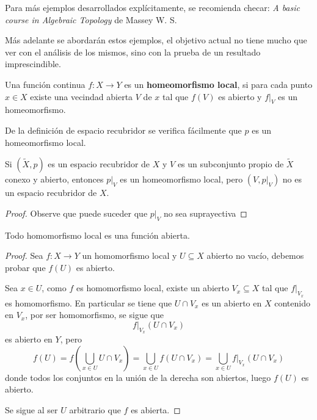 \documentclass{article}
\theoremstyle{largebreak}
\newcommand\cf[3]{\ensuremath{#1:#2\rightarrow#3}}
\begin{document}
    \begin{obs}
        Para más ejemplos desarrollados explícitamente, se recomienda checar: \textit{A basic course in Algebraic Topology} de Massey W. S.

        Más adelante se abordarán estos ejemplos, el objetivo actual no tiene mucho que ver con el análisis de los mismos, sino con la prueba de un resultado imprescindible.
    \end{obs}

    \begin{mydef}
        Una función continua $\cf{f}{X}{Y}$ es un \textbf{homeomorfismo local}, si para cada punto $x\in X$ existe una vecindad abierta $V$ de $x$ tal que $f(V)$ es abierto y $f\big|_{V}$ es un homeomorfismo.
    \end{mydef}

    \begin{obs}
        De la definición de espacio recubridor se verifica fácilmente que $p$ es un homeomorfismo local.
    \end{obs}

    \begin{exa}
        Si $(\widetilde{X},p)$ es un espacio recubridor de $X$ y $V$ es un subconjunto propio de $\widetilde{X}$ conexo y abierto, entonces $p\big|_{V}$ es un homeomorfismo local, pero $(V,p\big|_{V})$ no es un espacio recubridor de $X$.
    \end{exa}

    \begin{proof}
        Observe que puede suceder que $p\big|_{V}$ no sea suprayectiva
    \end{proof}

    \begin{propo}
        Todo homomorfismo local es una función abierta.
    \end{propo}

    \begin{proof}
        Sea $\cf{f}{X}{Y}$ un homomorfismo local y $U\subseteq X$ abierto no vacío, debemos probar que $f(U)$ es abierto.

        Sea $x\in U$, como $f$ es homomorfismo local, existe un abierto $V_x\subseteq X$ tal que $f\big|_{ V_x}$ es homomorfismo. En particular se tiene que $U\cap V_x$ es un abierto en $X$ contenido en $V_x$, por ser homomorfismo, se sigue que
        \begin{equation*}
            f|_{V_x}(U\cap V_x)
        \end{equation*}
        es abierto en $Y$, pero
        \begin{equation*}
            f(U)=f\left(\bigcup_{ x\in U} U\cap V_x\right)=\bigcup_{ x\in U} f(U\cap V_x)=\bigcup_{ x\in U} f\big|_{ V_x}(U\cap V_x)
        \end{equation*}
        donde todos los conjuntos en la unión de la derecha son abiertos, luego $f(U)$ es abierto.

        Se sigue al ser $U$ arbitrario que $f$ es abierta.
    \end{proof}
\end{document}
